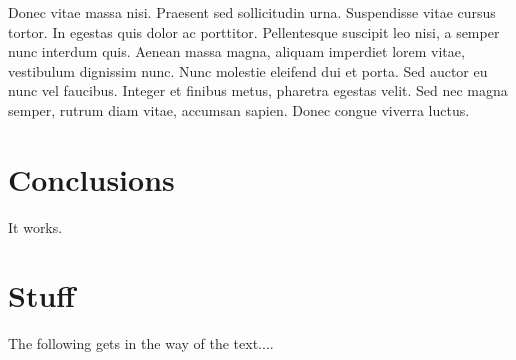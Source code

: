 \documentclass[sotoncolour]{uosarticle}     %
\begin{document}
Donec vitae massa nisi. Praesent sed sollicitudin urna. Suspendisse vitae cursus tortor. In egestas quis dolor ac porttitor. Pellentesque suscipit leo nisi, a semper nunc interdum quis. Aenean massa magna, aliquam imperdiet lorem vitae, vestibulum dignissim nunc. Nunc molestie eleifend dui et porta. Sed auctor eu nunc vel faucibus. Integer et finibus metus, pharetra egestas velit. Sed nec magna semper, rutrum diam vitae, accumsan sapien. Donec congue viverra luctus.
\section{Conclusions} \label{Section: Conclusions}
It works.
\backmatter
\appendix


\section{Stuff} \label{Section:Stuff}
The following gets in the way of the text....
\end{document}
